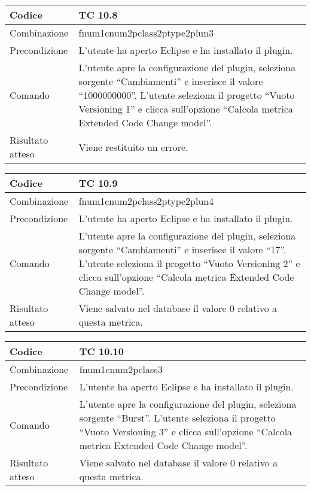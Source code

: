 \begin{table}[ht]
\begin{tabular}{|p{3cm}|p{9cm}|}
\hline
\cellcolor{lightgray}Codice				& TC 10.8								\\
\hline
\cellcolor{lightgray}Combinazione		& fnum1cnum2pclass2ptype2plun3									\\
\hline
\cellcolor{lightgray}Precondizione		& L'utente ha aperto Eclipse e ha installato il plugin.		\\
\hline
\cellcolor{lightgray}Comando			& L'utente apre la configurazione del plugin, seleziona sorgente ``Cambiamenti'' e inserisce il valore ``1000000000''. L'utente seleziona il progetto ``Vuoto Versioning 1''  e clicca sull'opzione ``Calcola metrica Extended Code Change model''.	\\
\hline
\cellcolor{lightgray}Risultato atteso	& Viene restituito un errore.\\
\hline
\end{tabular}
\end{table}

\begin{table}[ht]
\begin{tabular}{|p{3cm}|p{9cm}|}
\hline
\cellcolor{lightgray}Codice				& TC 10.9								\\
\hline
\cellcolor{lightgray}Combinazione		& fnum1cnum2pclass2ptype2plun4									\\
\hline
\cellcolor{lightgray}Precondizione		& L'utente ha aperto Eclipse e ha installato il plugin.		\\
\hline
\cellcolor{lightgray}Comando			& L'utente apre la configurazione del plugin, seleziona sorgente ``Cambiamenti'' e inserisce il valore ``17''. L'utente seleziona il progetto ``Vuoto Versioning 2''  e clicca sull'opzione ``Calcola metrica Extended Code Change model''.	\\
\hline
\cellcolor{lightgray}Risultato atteso	& Viene salvato nel database il valore 0 relativo a questa metrica.\\
\hline
\end{tabular}
\end{table}

\begin{table}[ht]
\begin{tabular}{|p{3cm}|p{9cm}|}
\hline
\cellcolor{lightgray}Codice				& TC 10.10								\\
\hline
\cellcolor{lightgray}Combinazione		& fnum1cnum2pclass3									\\
\hline
\cellcolor{lightgray}Precondizione		& L'utente ha aperto Eclipse e ha installato il plugin.		\\
\hline
\cellcolor{lightgray}Comando			& L'utente apre la configurazione del plugin, seleziona sorgente ``Burst''. L'utente seleziona il progetto ``Vuoto Versioning 3''  e clicca sull'opzione ``Calcola metrica Extended Code Change model''.	\\
\hline
\cellcolor{lightgray}Risultato atteso	& Viene salvato nel database il valore 0 relativo a questa metrica.\\
\hline
\end{tabular}
\end{table}


